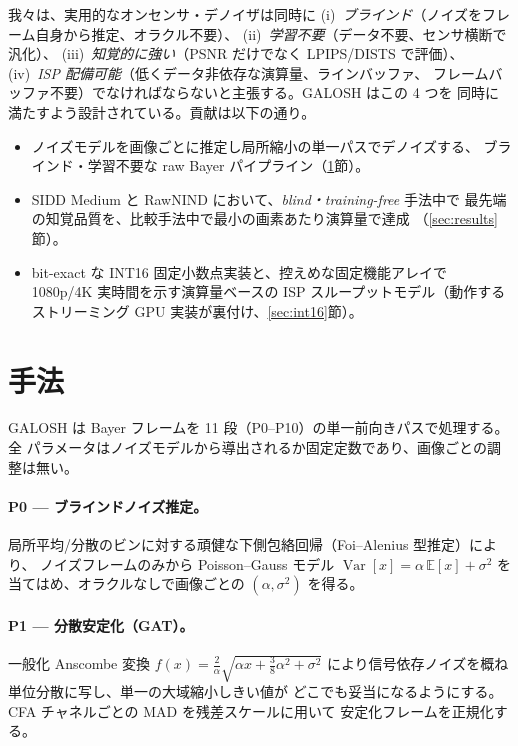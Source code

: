 \documentclass[twocolumn,10pt]{ltjsarticle}
\begin{document}
我々は、実用的なオンセンサ・デノイザは同時に
(i)~\emph{ブラインド}（ノイズをフレーム自身から推定、オラクル不要）、
(ii)~\emph{学習不要}（データ不要、センサ横断で汎化）、
(iii)~\emph{知覚的に強い}（PSNR だけでなく LPIPS/DISTS で評価）、
(iv)~\emph{ISP 配備可能}（低くデータ非依存な演算量、ラインバッファ、
フレームバッファ不要）でなければならないと主張する。GALOSH はこの 4 つを
同時に満たすよう設計されている。貢献は以下の通り。
\begin{itemize}\itemsep2pt
\item ノイズモデルを画像ごとに推定し局所縮小の単一パスでデノイズする、
ブラインド・学習不要な raw Bayer パイプライン（\ref{sec:method}節）。
\item SIDD Medium と RawNIND において、\emph{blind・training-free} 手法中で
最先端の知覚品質を、比較手法中で最小の画素あたり演算量で達成
（\ref{sec:results}節）。
\item bit-exact な INT16 固定小数点実装と、控えめな固定機能アレイで 1080p/4K
実時間を示す演算量ベースの ISP スループットモデル（動作するストリーミング
GPU 実装が裏付け、\ref{sec:int16}節）。
\end{itemize}

\section{手法}\label{sec:method}
GALOSH は Bayer フレームを 11 段（P0--P10）の単一前向きパスで処理する。全
パラメータはノイズモデルから導出されるか固定定数であり、画像ごとの調整は無い。

\paragraph{P0 --- ブラインドノイズ推定。}
局所平均/分散のビンに対する頑健な下側包絡回帰（Foi--Alenius 型推定）により、
ノイズフレームのみから Poisson--Gauss モデル $\operatorname{Var}[x]=\alpha\,
\mathbb{E}[x]+\sigma^2$ を当てはめ、オラクルなしで画像ごとの $(\alpha,\sigma^2)$
を得る。

\paragraph{P1 --- 分散安定化（GAT）。}
一般化 Anscombe 変換 $f(x)=\tfrac{2}{\alpha}\sqrt{\alpha x+\tfrac38\alpha^2+
\sigma^2}$ により信号依存ノイズを概ね単位分散に写し、単一の大域縮小しきい値が
どこでも妥当になるようにする。CFA チャネルごとの MAD を残差スケールに用いて
安定化フレームを正規化する。
\end{document}

